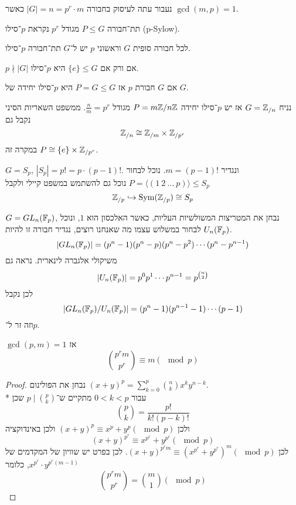 נעבור עתה לעיסוק בחבורה $|G| = n = p^r \cdot m$ כאשר $\gcd(m, p) = 1$.
\begin{definition}
	תת־חבורה $P \le G$ מגודל $p^r$ נקראת $p$־סילו (p-Sylow).
\end{definition}
\begin{theorem}
	לכל חבורה סופית $G$ וראשוני $p$ יש ל־$G$ תת־חבורה $p$־סילו.
\end{theorem}
\begin{remark}
	$p \nmid |G|$ אם ורק אם $\{e \} \le G$ היא $p$־סילו.
\end{remark}
\begin{example}
	אם $G$ חבורת $p$ אז $P = G \le G$ היא $p$־סילו יחידה של $G$.
\end{example}
\begin{example}
	נניח $G = \mathbb{Z}_{/n}$ אז יש $p$־סילו יחידה $P = m\mathbb{Z} / n\mathbb{Z}$ מגודל $\frac{n}{m} = p^r$.
	ממשפט השאריות הסיני נקבל גם
	\[
		\mathbb{Z}_{/n} \cong \mathbb{Z}_{/m} \times \mathbb{Z}_{/p^r}
	\]
	במקרה זה $P \cong \{ e \} \times \mathbb{Z}_{/p^r}$.
\end{example}
\begin{example}
	$G = S_p$, $|S_p| = p! = p \cdot (p - 1)! $. ונגדיר $m = (p - 1)! $.
	נוכל לבחור $P = \langle  (1\ 2\ \dots\ p)\rangle \le S_p$
	נוכל גם להשתמש במשפט קיילי ולקבל
	\[
		\mathbb{Z}_{/p} \hookrightarrow \operatorname{Sym}(\mathbb{Z}_{/p}) \cong S_p
	\]
\end{example}
\begin{example}
	$G = GL_n(\mathbb{F}_p)$,
	נבחן את המטריצות המשולשיות העליות, כאשר האלכסון הוא $1$, ונוכל לבחור במשלוש עצמו מה שאנחנו רוצים, נגדיר חבורה זו להיות $U_n(\mathbb{F}_p)$.
	\[
		|GL_n(\mathbb{F}_p)| = (p^n - 1)(p^n - p)(p^n - p^2) \cdots (p^n - p^{n - 1})
	\]
	משיקולי אלגברה לינארית.
	נראה גם
	\[
		|U_n(\mathbb{F}_p)| = p^0 p^1 \cdots p^{n - 1} = p^{\binom{n}{2}}
	\]
	לכן נקבל
	\[
		|GL_n(\mathbb{F}_p) / U_n(\mathbb{F}_p)| = (p^n - 1) (p^{n - 1} - 1) \cdots (p - 1)
	\]
	וזה זר ל־$p$.
\end{example}
\begin{lemma}
	$\gcd(p, m) = 1$ אז
	\[
		\binom{p^r m}{p^r} \equiv m (\mod p)
	\]
\end{lemma}
\begin{proof}
	נבחן את הפולינום ${(x + y)}^p = \sum_{k = 0}^{p} \binom{n}{k} x^k y^{n - k}$. \\*
	עבור $0 < k < p$ מתקיים ש־$p \mid \binom{p}{k}$ שכן
	\[
		\binom{p}{k} = \frac{p!}{k!(p - k)!}
	\]
	ולכן ${(x + y)}^p \equiv x^p + y^p (\mod p)$ ולכן באינדוקציה
	\[
		{(x + y)}^{p^r} \equiv x^{p^r} + y^{p^r} (\mod p)
	\]
	לכן ${(x + y)}^{p^r m} \equiv {(x^{p^r} + y^{p^r})}^m (\mod p)$.
	לכן בפרט יש שוויון של המקדמים של $x^{p^r} \cdot y^{p^r (m - 1)}$, כלומר
	\[
		\binom{p^r m}{p^r} = \binom{m}{1} (\mod p)
	\]
\end{proof}
